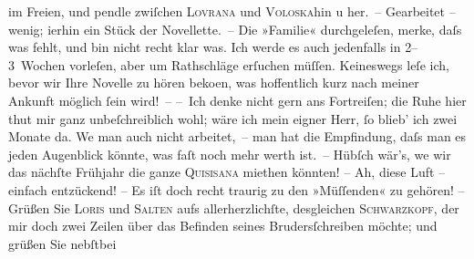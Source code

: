 \begin{ledgroupsized}[t]{13cm}
               im Freien, und pendle zwiſchen \textsc{Lovrana} und \textsc{Voloska}hin u her. – Gearbeitet – wenig; i{\geminationm}erhin ein Stück der Novellette. – Die »Familie« durchgeleſen, merke, daſs was fehlt, und bin nicht recht klar was.
               Ich werde es auch jedenfalls in 2–3 Wochen vorleſen, aber um Rathschläge erſuchen
               müſſen. Keineswegs leſe ich, bevor wir Ihre Novelle zu hören beko{\geminationm}en, was
               hoffentlich kurz nach meiner Ankunft möglich ſein wird! –\pend
           \pstart
           – Ich denke nicht gern ans Fortreiſen; die Ruhe hier thut mir ganz unbeſchreiblich
               wohl; wäre ich mein eigner Herr, ſo blieb’ ich zwei Monate da. We{\geminationn} man auch nicht {\pb}arbeitet, – man hat die Empfindung, daſs man es jeden Augenblick könnte, was faſt
               noch mehr werth ist. – Hübſch wär’s, we{\geminationn} wir das nächſte
               Frühjahr die ganze \textsc{Quisisana} miethen könnten! – Ah, diese Luft – einfach entzückend! – Es iſt doch recht
               traurig zu den »Müſſenden« zu gehören! –\pend
           \pstart
           Grüßen Sie \textsc{Loris} und \textsc{Salten} aufs allerherzlichſte, desgleichen \textsc{Schwarzkopf}, der mir doch zwei Zeilen über das Befinden seines Brudersſchreiben möchte; und grüßen Sie nebſtbei

\end{ledgroupsized}
